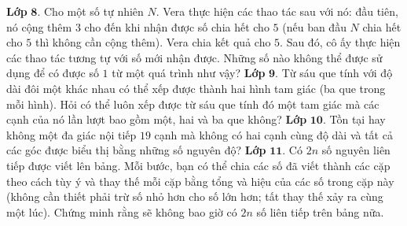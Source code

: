 \begin{multicols}{2}
\begin{figure}[H]
\begin{tikzpicture}[cackithi,scale=0.7]
		\end{tikzpicture}
	\end{figure}
	\textbf{\color{cackithi}Lớp} $\pmb{8.}$ Cho một số tự nhiên $N$. Vera thực hiện các thao tác sau với nó: đầu tiên, nó cộng thêm $3$ cho đến khi nhận được số chia hết cho $5$ (nếu ban đầu $N$ chia hết cho $5$ thì không cần cộng thêm). Vera chia kết quả cho $5$. Sau đó, cô ấy thực hiện các thao tác tương tự với số mới nhận được. Những số nào không thể được sử dụng để có được số $1$ từ một quá trình như vậy?
	\vskip 0.1cm
	\textbf{\color{cackithi}Lớp} $\pmb{9.}$ Từ sáu que tính với độ dài đôi một khác nhau có thể xếp được thành hai hình tam giác (ba que trong mỗi hình). Hỏi có thể luôn xếp được từ sáu que tính đó một tam giác mà các cạnh của nó lần lượt bao gồm một, hai và ba que không?
	\vskip 0.1cm
	\textbf{\color{cackithi}Lớp} $\pmb{10.}$ Tồn tại hay không một đa giác nội tiếp $19$ cạnh mà không có hai cạnh cùng độ dài và tất cả các góc được biểu thị bằng những số nguyên độ?
	\vskip 0.1cm
	\textbf{\color{cackithi}Lớp} $\pmb{11.}$ Có $2n$ số nguyên liên tiếp được viết lên bảng. Mỗi bước, bạn có thể chia các số đã viết thành các cặp theo cách tùy ý và thay thế mỗi cặp bằng tổng và hiệu của các số trong cặp này (không cần thiết phải trừ số nhỏ hơn cho số lớn hơn; tất thay thế xảy ra cùng một lúc). Chứng minh rằng sẽ không bao giờ có $2n$ số liên tiếp trên bảng nữa.
\end{multicols}
\newpage
\begingroup
{}
